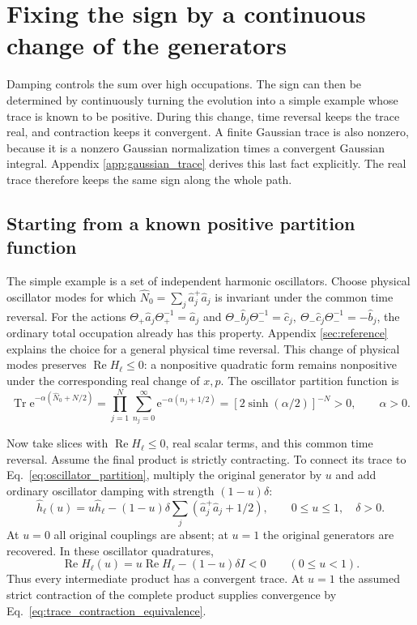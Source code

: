 \documentclass[11pt,a4paper]{article}
\newcommand{\Tr}{\operatorname{Tr}}
\newcommand{\ee}{\mathrm e}
\numberwithin{equation}{section}
\begin{document}
\section{Fixing the sign by a continuous change of the generators}
\label{sec:trace}
Damping controls the sum over high occupations. The sign can then be
determined by continuously turning the evolution into a simple example
whose trace is known to be positive. During this change, time reversal
keeps the trace real, and contraction keeps it convergent. A finite
Gaussian trace is also nonzero, because it is a nonzero Gaussian
normalization times a convergent Gaussian integral. Appendix
\ref{app:gaussian_trace} derives this last fact explicitly.
The real trace therefore keeps the same sign along the whole path.

\subsection{Starting from a known positive partition function}

The simple example is a set of independent harmonic oscillators.
Choose physical oscillator modes for which
$\hat N_0=\sum_j\hat a_j^+\hat a_j$ is invariant under the common time
reversal. For the actions $\Theta_+\hat a_j\Theta_+^{-1}=\hat a_j$ and
$\Theta_-\hat b_j\Theta_-^{-1}=\hat c_j,\
\Theta_-\hat c_j\Theta_-^{-1}=-\hat b_j$, the ordinary
total occupation already has this property. Appendix
\ref{sec:reference} explains the choice for a general physical time
reversal. This change of physical modes preserves
$\operatorname{Re}H_\ell\leq0$: a nonpositive quadratic form remains
nonpositive under the corresponding real change of $x,p$.
The oscillator partition function is
\begin{equation}
 \Tr\ee^{-\alpha(\hat N_0+N/2)}
 =\prod_{j=1}^N\sum_{n_j=0}^{\infty}
   \ee^{-\alpha(n_j+1/2)}
 =[2\sinh(\alpha/2)]^{-N}>0,\qquad\alpha>0.
 \label{eq:oscillator_partition}
\end{equation}

Now take slices with $\operatorname{Re}H_\ell\leq0$, real scalar terms,
and this common time reversal. Assume the final product is strictly
contracting. To connect its trace to Eq.~\eqref{eq:oscillator_partition},
multiply the original generator by $u$ and add ordinary oscillator
damping with strength $(1-u)\delta$:
\begin{equation}
 \hat h_\ell(u)=u\hat h_\ell-(1-u)\delta
 \sum_j(\hat a_j^+\hat a_j+1/2),
 \qquad 0\leq u\leq1,\quad\delta>0.
 \label{eq:thermal_deformation}
\end{equation}
At $u=0$ all original couplings are absent; at $u=1$ the original
generators are recovered. In these oscillator quadratures,
\begin{equation}
 \operatorname{Re}H_\ell(u)
 =u\operatorname{Re}H_\ell-(1-u)\delta I<0
 \qquad (0\leq u<1).
 \label{eq:deformation_damping}
\end{equation}
Thus every intermediate product has a convergent trace. At $u=1$ the
assumed strict contraction of the complete product supplies convergence
by Eq.~\eqref{eq:trace_contraction_equivalence}.
\end{document}

